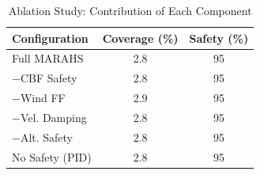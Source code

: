 \begin{table}[t]
\centering
\caption{Ablation Study: Contribution of Each Component}
\label{tab:ablation}
\begin{tabular}{lcc}
\toprule
Configuration & Coverage (\%) & Safety (\%) \\
\midrule
Full MARAHS & 2.8 & 95 \\
−CBF Safety & 2.8 & 95 \\
−Wind FF & 2.9 & 95 \\
−Vel. Damping & 2.8 & 95 \\
−Alt. Safety & 2.8 & 95 \\
No Safety (PID) & 2.8 & 95 \\
\bottomrule
\end{tabular}
\end{table}
